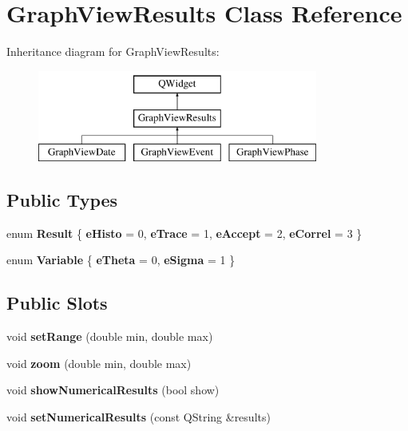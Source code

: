 \hypertarget{class_graph_view_results}{\section{Graph\-View\-Results Class Reference}
\label{class_graph_view_results}
}
Inheritance diagram for Graph\-View\-Results\-:\begin{figure}[H]
\begin{center}
\leavevmode
\includegraphics[height=3.000000cm]{class_graph_view_results}
\end{center}
\end{figure}
\subsection*{Public Types}
\begin{DoxyCompactItemize}
\item 
enum {\bfseries Result} \{ {\bfseries e\-Histo} = 0, 
{\bfseries e\-Trace} = 1, 
{\bfseries e\-Accept} = 2, 
{\bfseries e\-Correl} = 3
 \}
\item 
enum {\bfseries Variable} \{ {\bfseries e\-Theta} = 0, 
{\bfseries e\-Sigma} = 1
 \}
\end{DoxyCompactItemize}
\subsection*{Public Slots}
\begin{DoxyCompactItemize}
\item 
\hypertarget{class_graph_view_results_adedf912569f2f1bfce2ce18d83eff743}{void {\bfseries set\-Range} (double min, double max)}\label{class_graph_view_results_adedf912569f2f1bfce2ce18d83eff743}

\item 
\hypertarget{class_graph_view_results_af7a95a98429d6e1098b254a132d62bf7}{void {\bfseries zoom} (double min, double max)}\label{class_graph_view_results_af7a95a98429d6e1098b254a132d62bf7}

\item 
\hypertarget{class_graph_view_results_ab6ce38f587f19b5cfa5f7ef25d98a040}{void {\bfseries show\-Numerical\-Results} (bool show)}\label{class_graph_view_results_ab6ce38f587f19b5cfa5f7ef25d98a040}

\item 
\hypertarget{class_graph_view_results_aba70ac0f4b321aa7d088ececed235564}{void {\bfseries set\-Numerical\-Results} (const Q\-String \&results)}\label{class_graph_view_results_aba70ac0f4b321aa7d088ececed235564}

\end{DoxyCompactItemize}
